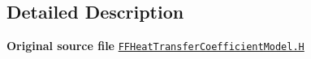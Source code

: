 \subsection{Detailed Description}
{\bfseries Original source file} \href{../../../home/carlo/data/GeN-Foam/GeN-Foam_ffn/GeN-Foam/GeN-Foam/classes/thermalHydraulics/src/physicsModels/heatTransferModels/FFHeatTransferCoefficientModels/FFHeatTransferCoefficientModel.H}{\tt F\+F\+Heat\+Transfer\+Coefficient\+Model.\+H} 